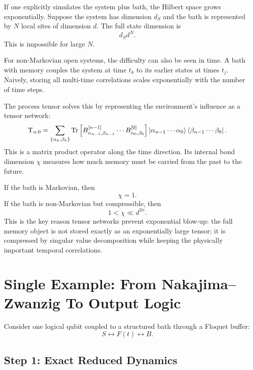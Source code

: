 \documentclass[11pt]{article}
\begin{document}
If one explicitly simulates the system plus bath, the Hilbert space grows exponentially.  Suppose
the system has dimension $d_S$ and the bath is represented by $N$ local sites of dimension $d$.
The full state dimension is
\begin{equation}
    d_S d^N.
\end{equation}
This is impossible for large $N$.

For non-Markovian open systems, the difficulty can also be seen in time.  A bath with memory
couples the system at time $t_k$ to its earlier states at times $t_j$.  Naively, storing all multi-time
correlations scales exponentially with the number of time steps.

The process tensor solves this by representing the environment's influence as a tensor network:
\begin{equation}
    \Upsilon_{n:0}
    =
    \sum_{\{\alpha_k,\beta_k\}}
    \Tr\left[
        B^{[n-1]}_{\alpha_{n-1},\beta_{n-1}}
        \cdots
        B^{[0]}_{\alpha_0,\beta_0}
    \right]
    \ket{\alpha_{n-1}\cdots\alpha_0}
    \bra{\beta_{n-1}\cdots\beta_0}.
\end{equation}
This is a matrix product operator along the time direction.  Its internal bond dimension
$\chi$ measures how much memory must be carried from the past to the future.

If the bath is Markovian, then
\begin{equation}
    \chi = 1.
\end{equation}
If the bath is non-Markovian but compressible, then
\begin{equation}
    1 < \chi \ll d^{2n}.
\end{equation}
This is the key reason tensor networks prevent exponential blow-up: the full memory object
is not stored exactly as an exponentially large tensor; it is compressed by singular value
decomposition while keeping the physically important temporal correlations.

\section{Single Example: From Nakajima--Zwanzig To Output Logic}

Consider one logical qubit coupled to a structured bath through a Floquet buffer:
\begin{equation}
    S \longleftrightarrow F(t) \longleftrightarrow B.
\end{equation}

\subsection*{Step 1: Exact Reduced Dynamics}
\end{document}
